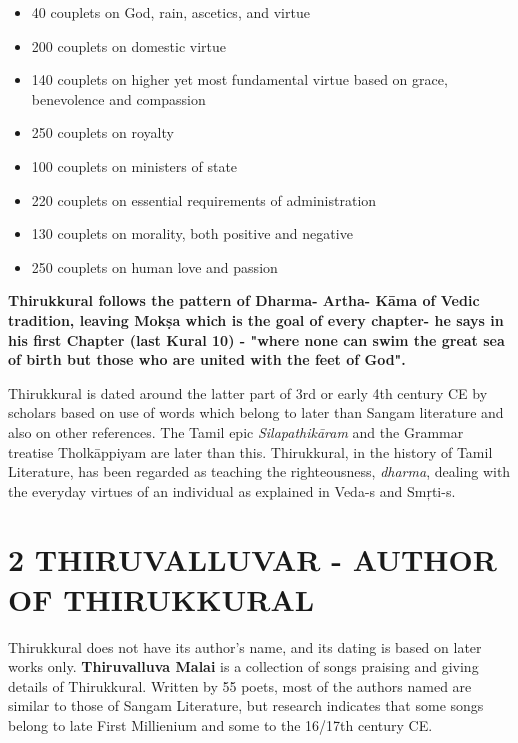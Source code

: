 \begin{itemize}
\item 40 couplets on God, rain, ascetics, and virtue

 \item 200 couplets on domestic virtue

 \item 140 couplets on higher yet most fundamental virtue based on grace, benevolence and compassion

 \item 250 couplets on royalty

 \item 100 couplets on ministers of state

 \item 220 couplets on essential requirements of administration

 \item 130 couplets on morality, both positive and negative

 \item 250 couplets on human love and passion

\end{itemize}

\textbf{Thirukkural follows the pattern of Dharma- Artha- Kāma of Vedic tradition, leaving Mokṣa which is the goal of every chapter- he says in his first Chapter (last Kural 10) - "where none can swim the great sea of birth but those who are united with the feet of God".}

Thirukkural is dated around the latter part of 3rd or early 4th century CE by scholars based on use of words which belong to later than Sangam literature and also on other references. The Tamil epic \textit{Silapathikāram} and the Grammar treatise Tholkāppiyam are later than this. Thirukkural, in the history of Tamil Literature, has been regarded as teaching the righteousness, \textit{dharma}, dealing with the everyday virtues of an individual as explained in Veda-s and Smŗti-s.


\section*{2 THIRUVALLUVAR - AUTHOR OF THIRUKKURAL}

Thirukkural does not have its author’s name, and its dating is based on later works only. \textbf{Thiruvalluva Malai} is a collection of songs praising and giving details of Thirukkural. Written by 55 poets, most of the authors named are similar to those of Sangam Literature, but research indicates that some songs belong to late First Millienium and some to the 16/17th century CE.


